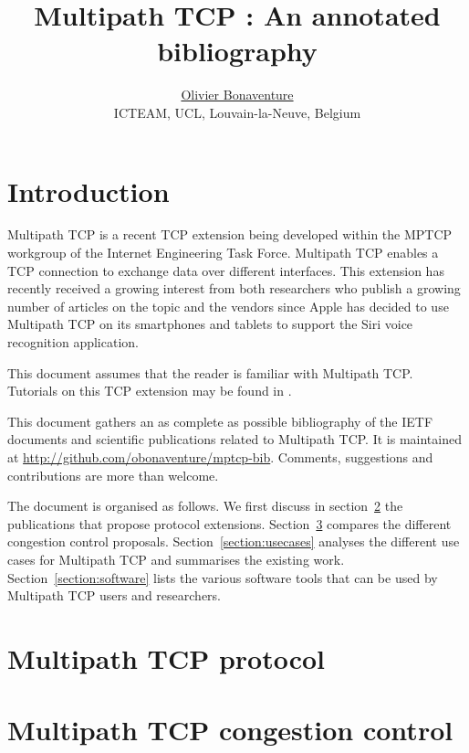 \documentclass{article}
\title{Multipath TCP : An annotated bibliography}
\author{\href{http://perso.uclouvain.be/olivier.bonaventure}{Olivier Bonaventure}\\
\small{ICTEAM, UCL, Louvain-la-Neuve, Belgium}
}
\newcommand{\biburl}{\url{http://github.com/obonaventure/mptcp-bib}}
\begin{document}
\maketitle 



\section{Introduction}

Multipath TCP\cite{rfc6824} is a recent TCP extension being developed within the MPTCP workgroup of the Internet Engineering Task Force. Multipath TCP enables a TCP connection to exchange data over different interfaces. This extension has recently received a growing interest from both researchers who publish a growing number of articles on the topic and the vendors since Apple has decided to use Multipath TCP on its smartphones and tablets to support the Siri voice recognition application. 

This document assumes that the reader is familiar with Multipath TCP. Tutorials on this TCP extension may be found in \cite{Paasch_MPTCP:2014,Raiciu_ebook:2013,Bonaventure_Overview:2012}.

This document gathers an as complete as possible bibliography of the IETF documents and scientific publications related to Multipath TCP. It is maintained at \biburl. Comments, suggestions and contributions are more than welcome. 

The document is organised as follows. We first discuss in section~\ref{section:protocol} the publications that propose protocol extensions. Section~\ref{section:congestion} compares the different congestion control proposals. Section~\ref{section:usecases} analyses the different use cases for Multipath TCP and summarises the existing work. Section~\ref{section:software} lists the various software tools that can be used by Multipath TCP users and researchers.


\section{Multipath TCP protocol}\label{section:protocol}




\section{Multipath TCP congestion control}\label{section:congestion}
\end{document}

